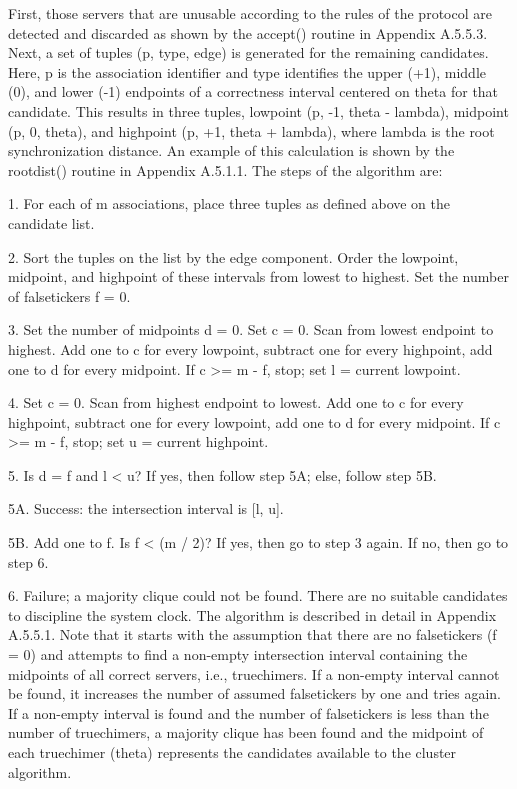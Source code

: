 First, those servers that are unusable according to the rules of the
protocol are detected and discarded as shown by the accept() routine
in Appendix A.5.5.3.  Next, a set of tuples (p, type, edge) is
generated for the remaining candidates.  Here, p is the association
identifier and type identifies the upper (+1), middle (0), and lower
(-1) endpoints of a correctness interval centered on theta for that
candidate.  This results in three tuples, lowpoint (p, -1, theta -
lambda), midpoint (p, 0, theta), and highpoint (p, +1, theta +
lambda), where lambda is the root synchronization distance.  An
example of this calculation is shown by the rootdist() routine in
Appendix A.5.1.1.  The steps of the algorithm are:

1.  For each of m associations, place three tuples as defined above
on the candidate list.

2.  Sort the tuples on the list by the edge component.  Order the
lowpoint, midpoint, and highpoint of these intervals from lowest to
highest.  Set the number of falsetickers f = 0.

3.  Set the number of midpoints d = 0.  Set c = 0.  Scan from lowest
endpoint to highest.  Add one to c for every lowpoint, subtract one
for every highpoint, add one to d for every midpoint.  If c >= m - f,
stop; set l = current lowpoint.

4.  Set c = 0.  Scan from highest endpoint to lowest.  Add one to c
for every highpoint, subtract one for every lowpoint, add one to d
for every midpoint.  If c >= m - f, stop; set u = current highpoint.

5.  Is d = f and l < u?  If yes, then follow step 5A; else, follow
step 5B.

5A. Success: the intersection interval is [l, u].

5B. Add one to f.  Is f < (m / 2)?  If yes, then go to step 3 again.
If no, then go to step 6.

6.  Failure; a majority clique could not be found.  There are no
suitable candidates to discipline the system clock.
The algorithm is described in detail in Appendix A.5.5.1.  Note that
it starts with the assumption that there are no falsetickers (f = 0)
and attempts to find a non-empty intersection interval containing the
midpoints of all correct servers, i.e., truechimers.  If a non-empty
interval cannot be found, it increases the number of assumed
falsetickers by one and tries again.  If a non-empty interval is
found and the number of falsetickers is less than the number of
truechimers, a majority clique has been found and the midpoint of
each truechimer (theta) represents the candidates available to the
cluster algorithm.


